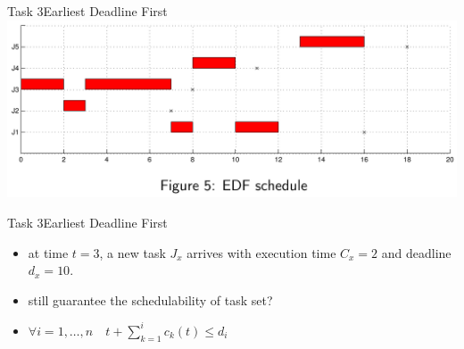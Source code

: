 \begin{frame}{Task 3}{Earliest Deadline First}
  \includegraphics[width=\textwidth]{./figures/3_sol.png}
\end{frame}

\begin{frame}{Task 3}{Earliest Deadline First}
  \begin{task}
    \begin{itemize}
      \item at time $t = 3$, a new task $J_x$ arrives with execution time $C_x = 2$ and deadline $d_x = 10$.
      \item still \alert{guarantee the schedulability} of task set?
    \end{itemize}
  \end{task}
  \begin{requirements}
    \begin{itemize}
      \item $\forall i=1, \ldots, n \quad t+\sum_{k=1}^i c_k(t) \leq d_i$
    \end{itemize}
  \end{requirements}
\end{frame}

\if{}\fi
